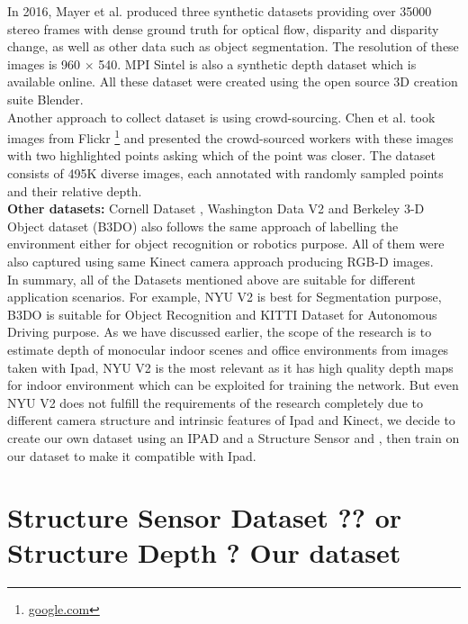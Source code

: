 In 2016, Mayer et al. \cite{MIFDB16} produced three synthetic datasets providing over 35000 stereo frames with dense ground truth for optical flow, disparity and disparity change, as well as other data such as object segmentation. The resolution of these images is 960 $\times$ 540. MPI Sintel \cite{Butler:ECCV:2012} is also a synthetic depth dataset which is available online. All these dataset were created using the open source 3D creation suite Blender.\\

Another approach to collect dataset is using crowd-sourcing. Chen et al. \cite{DBLP:journals/corr/ChenFYD16} took images from Flickr \footnote{ \url{google.com}}  and presented the crowd-sourced workers with these images with two highlighted points asking which of the point was closer. The dataset consists of 495K diverse images, each annotated with randomly sampled points and their relative depth.\\

\textbf{Other datasets:} Cornell Dataset \cite{3Dscene} , Washington Data V2 \cite{Washington} and  Berkeley 3-D Object dataset (B3DO) \cite{Janoch:EECS-2012-85} also follows the same approach of labelling the environment either for object recognition or robotics purpose. All of them were also captured using same Kinect camera approach producing RGB-D images.\\

In summary, all of the Datasets mentioned above are suitable for different application scenarios. For example, NYU V2 \cite{Silberman:ECCV12} is best for Segmentation purpose, B3DO \cite{Janoch:EECS-2012-85} is suitable for Object Recognition and KITTI Dataset \cite{Geiger2013IJRR} for Autonomous Driving purpose. As we have discussed earlier, the scope of the research is to estimate depth of monocular indoor scenes and office environments from  images taken with Ipad, NYU V2 is the most relevant as it has high quality depth maps for indoor environment which can be exploited for training the network. But even NYU V2 does not fulfill the requirements of the research completely due to different camera structure and intrinsic features of Ipad and Kinect, we decide to create our own dataset using an IPAD and a Structure Sensor and   , then train on our dataset to make it compatible with Ipad.

\section{Structure Sensor Dataset ?? or Structure Depth ? Our dataset} 


